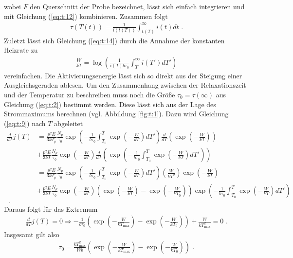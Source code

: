 wobei $F$ den Querschnitt der Probe bezeichnet, lässt sich einfach integrieren und mit Gleichung (\ref{eq:t:12}) kombinieren.
Zusammen folgt
\begin{align}
\tau(T(t))=\frac{1}{i(t(T))}\int_{t(T)}^\infty i(t)dt \text{ .}
\label{eq:t:14}
\end{align}
Zuletzt lässt sich Gleichung (\ref{eq:t:14}) durch die Annahme der konstanten Heizrate zu
\begin{align}
\frac{W}{kT}=\log\left(\frac{1}{i(T)b\tau_0}\int_T^\infty i(T\prime)dT\prime\right)
\label{eq:t:15}
\end{align}
vereinfachen.
Die Aktivierungsenergie lässt sich so direkt aus der Steigung einer Ausgleichsgeraden ablesen.
Um den Zusammenhang zwischen der Relaxationszeit und der Temperatur zu beschreiben muss noch die Größe $\tau_0=\tau(\infty)$ aus Gleichung (\ref{eq:t:2}) bestimmt werden. 
Diese lässt sich aus der Lage des Strommaximums berechnen (vgl. Abbildung \ref{fig:t:1}).
Dazu wird Gleichung (\ref{eq:t:9}) nach $T$ abgeleitet
\begin{align*}
\frac{d}{dT}j(T)&=\frac{p^2E}{3kT_p}\frac{N_p}{\tau_0}\exp\left(-\frac{1}{b\tau_0}\int_{T_0}^T\exp\left(-\frac{W}{kT}\right)dT\prime\right)\frac{d}{dT}\left(\exp \left(-\frac{W}{kT}\right)\right)\\
&+\frac{p^2E}{3kT}\frac{N_p}{\tau_0}\exp \left(-\frac{W}{kT}\right)\frac{d}{dT}\left(\exp\left(-\frac{1}{b\tau_0}\int_{T_0}^T\exp\left(-\frac{W}{kT}\right)dT\prime\right)\right)\\
&=\frac{p^2E}{3kT_p}\frac{N_p}{\tau_0}\exp\left(-\frac{1}{b\tau_0}\int_{T_0}^T\exp\left(-\frac{W}{kT}\right)dT\prime\right)\left(\frac{W}{kT^2}\right)\exp\left(-\frac{W}{kT}\right)\\
&+\frac{p^2E}{3kT}\frac{N_p}{\tau_0}\exp \left(-\frac{W}{kT}\right)\left(\exp\left(-\frac{W}{kT}\right)-\exp\left(-\frac{W}{kT_0}\right)\right)\exp\left(-\frac{1}{b\tau_0}\int_{T_0}^T\exp\left(-\frac{W}{kT}\right)dT\prime\right)\\ \text{ .}
\end{align*}
Daraus folgt für das Extremum
\begin{align*}
\frac{d}{dT}j(T)=0 \Longrightarrow -\frac{1}{b\tau_0}\left(\exp\left(-\frac{W}{kT_\text{max}}\right)-\exp\left(-\frac{W}{kT_0}\right)\right)+\frac{W}{kT_\text{max}^2}=0 \text{ .}
\end{align*}
Insgesamt gilt also
\begin{align}
\tau_0=\frac{kT_\text{max}^2}{Wb}\left(\exp\left(-\frac{W}{kT_\text{max}}\right)-\exp\left(-\frac{W}{kT_0}\right)\right)  \text{ .}
\label{eq:t:16}
\end{align}